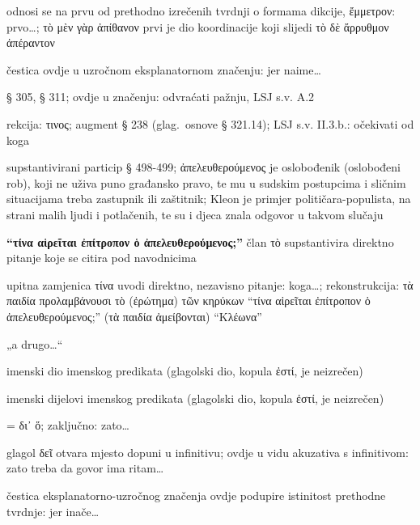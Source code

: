 \begin{description}[noitemsep]
\item[μὲν γὰρ ] odnosi se na prvu od prethodno izrečenih tvrdnji o formama dikcije, ἔμμετρον: prvo…; \textgreek[variant=ancient]{τὸ μὲν γὰρ ἀπίθανον} prvi je dio koordinacije koji slijedi \textgreek[variant=ancient]{τὸ δὲ ἄρρυθμον ἀπέραντον}
\item[γὰρ] čestica ovdje u uzročnom eksplanatornom značenju: jer naime…
\item[ἐξίστησι] § 305, § 311; ovdje u značenju: odvraćati pažnju, LSJ s.v. A.2
\item[προλαμβάνουσι ] rekcija: τινος; augment § 238 (glag.\ osnove § 321.14); LSJ s.v. II.3.b.: očekivati od koga
\item[ὁ ἀπελευθερούμενος] supstantivirani particip § 498-499; \textgreek[variant=ancient]{ἀπελευθερούμενος} je oslobođenik (oslobođeni rob), koji ne uživa puno građansko pravo, te mu u sudskim postupcima i sličnim situacijama treba zastupnik ili zaštitnik; Kleon je primjer političara-populista, na strani malih ljudi i potlačenih, te su i djeca znala odgovor u takvom slučaju
\item[τὸ] \textbf{\textgreek[variant=ancient]{``τίνα αἱρεῖται ἐπίτροπον ὁ ἀπελευθερούμενος;''}} član τὸ supstantivira direktno pitanje koje se citira pod navodnicima
\item[τίνα… αἱρεῖται] upitna zamjenica τίνα uvodi direktno, nezavisno pitanje: koga…; rekonstrukcija: \textgreek[variant=ancient]{τὰ παιδία προλαμβάνουσι τὸ (ἐρώτημα) τῶν κηρύκων “τίνα αἱρεῖται ἐπίτροπον ὁ ἀπελευθερούμενος;” (τὰ παιδία ἀμείβονται) “Κλέωνα”}
\item[τὸ δὲ ἄρρυθμον] „a drugo…“
\item[ἀπέραντον] imenski dio imenskog predikata (glagolski dio, kopula ἐστί, je neizrečen)
\item[ἀηδὲς γὰρ καὶ ἄγνωστον] imenski dijelovi imenskog predikata (glagolski dio, kopula ἐστί, je neizrečen)
\end{description}


\begin{description}[noitemsep]
\item[διὸ]  = δι᾽ ὅ; zaključno: zato…
\item[δεῖ] glagol δεῖ otvara mjesto dopuni u infinitivu; ovdje u vidu akuzativa s infinitivom: zato treba da govor ima ritam…
\item[γὰρ ] čestica eksplanatorno-uzročnog značenja ovdje podupire istinitost prethodne tvrdnje: jer inače…
\end{description}

